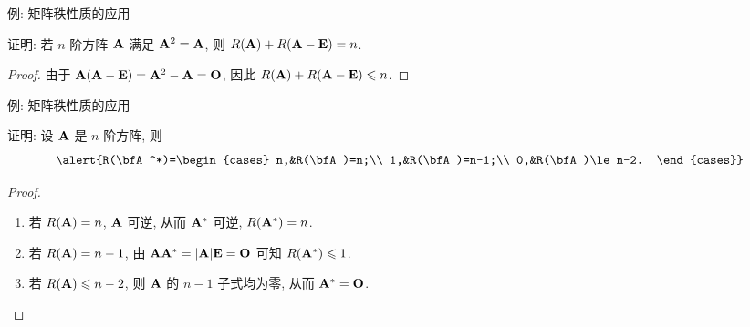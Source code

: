\begin{frame}{例: 矩阵秩性质的应用}
	\onslide<+->
	\begin{example}
		证明: 若 $n$ 阶方阵 ${\mathbf{A}}$ 满足 ${\mathbf{A}}^2={\mathbf{A}}$, 则 $R(\bfA)+R(\bfA-\bfE)=n$.
	\end{example}
	\onslide<+->
	\begin{proof}
		由于 ${\mathbf{A}}({\mathbf{A}}-{\mathbf{E}})={\mathbf{A}}^2-{\mathbf{A}}={\mathbf{O}}$, 因此 $R({\mathbf{A}})+R({\mathbf{A}}-{\mathbf{E}})\leqslant n$.
		\onslide<+->{%
			故 $R(\bfA)+R(\bfA-\bfE)=n$.
		}
	\end{proof}
\end{frame}


\begin{frame}{例: 矩阵秩性质的应用}
	\onslide<+->
	\begin{example}
		证明: 设 ${\mathbf{A}}$ 是 $n$ 阶方阵, 则
		\[\alert{R(\bfA^*)=\begin{cases}
			n,&R(\bfA)=n;\\
			1,&R(\bfA)=n-1;\\
			0,&R(\bfA)\le n-2.
		\end{cases}}\]
	\end{example}
	\onslide<+->
	\begin{proof}
		\begin{enumerate}
			\item 若 $R({\mathbf{A}})=n$, ${\mathbf{A}}$ 可逆, 从而 ${\mathbf{A}}^*$ 可逆, $R({\mathbf{A}}^*)=n$.
			\item 若 $R({\mathbf{A}})=n-1$, 由 ${\mathbf{A}}{\mathbf{A}}^*=|{\mathbf{A}}|{\mathbf{E}}={\mathbf{O}}$ 可知 $R({\mathbf{A}}^*)\leqslant 1$.
			\onslide<+->{故 $R(\bfA^*)=1$.}
			\item 若 $R({\mathbf{A}})\leqslant n-2$, 则 ${\mathbf{A}}$ 的 $n-1$ 子式均为零, 从而 ${\mathbf{A}}^*={\mathbf{O}}$.\qedhere
		\end{enumerate}
	\end{proof}
\end{frame}


